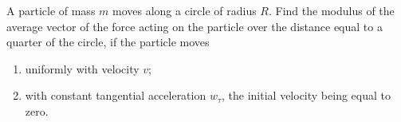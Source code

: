 \item A particle of mass \( m \) moves along a circle of radius \( R \). Find the modulus of the average vector of the force acting on the particle over the distance equal to a quarter of the circle, if the particle moves
    \begin{enumerate}
        \item uniformly with velocity \( v \);
        \item with constant tangential acceleration \( w_{\tau} \), the initial velocity being equal to zero.
    \end{enumerate}
    \begin{center}
    \end{center}